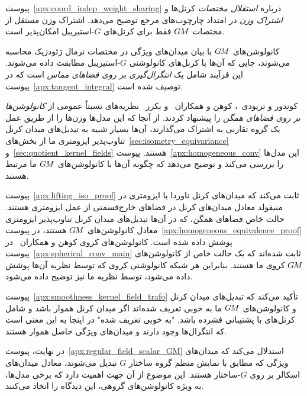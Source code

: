پیوست~\ref{apx:coord_indep_weight_sharing} درباره \emph{استقلال مختصات} کرنل‌ها و \emph{اشتراک وزن} در امتداد چارچوب‌های مرجع توضیح می‌دهد.
اشتراک وزن مستقل از مختصات $G\mkern-1.4muM$ فقط برای کرنل‌های $G$-استیریبل امکان‌پذیر است.

کانولوشن‌های $G\mkern-1.4muM$ با بیان میدان‌های ویژگی در مختصات نرمال ژئودزیک محاسبه می‌شوند، جایی که آن‌ها با کرنل‌های کانولوشنی $G$-استیریبل مطابقت داده می‌شوند.
این فرآیند شامل یک \emph{انتگرال‌گیری بر روی فضاهای مماس} است که در پیوست~\ref{apx:tangent_integral} توصیف شده است.


کوندور و تریودی~\cite{Kondor2018-GENERAL}، کوهن و همکاران~\cite{Cohen2019-generaltheory} و بکرز~\cite{bekkers2020bspline} نظریه‌های نسبتاً عمومی از \emph{کانولوشن‌ها بر روی فضاهای همگن} را پیشنهاد کردند. از آنجا که این مدل‌ها وزن‌ها را از طریق عمل یک گروه تقارنی به اشتراک می‌گذارند، آن‌ها بسیار شبیه به تبدیل‌های میدان کرنل تناوب‌پذیر ایزومتری ما از بخش‌های~\ref{sec:isometry_equivariance} و~\ref{sec:quotient_kernel_fields} هستند. پیوست~\ref{apx:homogeneous_conv} این مدل‌ها را بررسی می‌کند و توضیح می‌دهد که چگونه آن‌ها با کانولوشن‌های $G\mkern-1.4muM$ ما مرتبط هستند.


پیوست~\ref{apx:lifting_iso_proof} ثابت می‌کند که میدان‌های کرنل ناوردا با ایزومتری در منیفولد معادل میدان‌های کرنل در فضاهای خارج‌قسمتی از عمل ایزومتری هستند.
حالت خاص فضاهای همگن، که در آن‌ها تبدیل‌های میدان کرنل تناوب‌پذیر ایزومتری معادل کانولوشن‌های $G\mkern-1.4muM$ هستند، در پیوست~\ref{apx:homogeneous_equivalence_proof} پوشش داده شده است.
کانولوشن‌های کروی کوهن و همکاران~\cite{Cohen2019-generaltheory} در پیوست~\ref{apx:spherical_conv_main} ثابت شده‌اند که یک حالت خاص از کانولوشن‌های $G\mkern-1.4muM$ کروی ما هستند.
بنابراین هر شبکه کانولوشنی کروی که توسط نظریه آن‌ها پوشش داده می‌شود، توسط نظریه ما نیز توضیح داده می‌شود.

پیوست~\ref{apx:smoothness_kernel_field_trafo} تأکید می‌کند که تبدیل‌های میدان کرنل و کانولوشن‌های $G\mkern-1.4muM$ ما به خوبی تعریف شده‌اند اگر میدان کرنل هموار باشد و شامل کرنل‌های با پشتیبانی فشرده باشد.
"به خوبی تعریف شده" در اینجا به این معنی است که انتگرال‌ها وجود دارند و میدان‌های ویژگی حاصل هموار هستند.

در نهایت، پیوست~\ref{apx:regular_field_scalar_GM} استدلال می‌کند که میدان‌های ویژگی که مطابق با نمایش منظم گروه ساختار $G$ تبدیل می‌شوند، معادل میدان‌های اسکالر بر روی $G$-ساختار هستند.
این موضوع از آن جهت اهمیت دارد که برخی مدل‌ها، به ویژه کانولوشن‌های گروهی، این دیدگاه را اتخاذ می‌کنند.